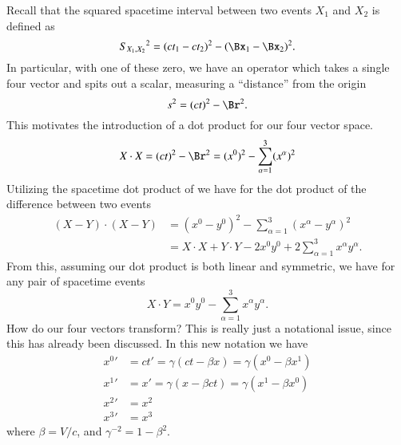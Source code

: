 Recall that the squared spacetime interval between two events \(X_1\) and \(X_2\) is defined as
%
\begin{equation}\label{eqn:relativisticElectrodynamicsT1:60}
{S_{X_1, X_2}}^2 = (ct_1 - c t_2)^2 - (\Bx_1 - \Bx_2)^2.
\end{equation}
%
In particular, with one of these zero, we have an operator which takes a single four vector and spits out a scalar, measuring a ``distance'' from the origin
%
\begin{equation}\label{eqn:relativisticElectrodynamicsT1:30}
s^2 = (ct)^2 - \Br^2.
\end{equation}
%
This motivates the introduction of a dot product for our four vector space.
%
\begin{equation}\label{eqn:relativisticElectrodynamicsT1:50}
X \cdot X = (ct)^2 - \Br^2 = (x^0)^2 - \sum_{\alpha=1}^3 (x^\alpha)^2
\end{equation}
%
Utilizing the spacetime dot product of  we have for the dot product of the difference between two events
%
\begin{equation}\label{eqn:relativisticElectrodynamicsT1a:140}
\begin{aligned}
(X - Y) \cdot (X - Y)
&=
(x^0 - y^0)^2 - \sum_{\alpha =1}^3 (x^\alpha - y^\alpha)^2 \\
&=
X \cdot X + Y \cdot Y - 2 x^0 y^0 + 2 \sum_{\alpha =1}^3 x^\alpha y^\alpha.
\end{aligned}
\end{equation}
%
From this, assuming our dot product  is both linear and symmetric, we have for any pair of spacetime events
%
\begin{equation}\label{eqn:relativisticElectrodynamicsT1:55}
X \cdot Y = x^0 y^0 - \sum_{\alpha =1}^3 x^\alpha y^\alpha.
\end{equation}
%
How do our four vectors transform?  This is really just a notational issue, since this has already been discussed.  In this new notation we have
%
\begin{equation}\label{eqn:relativisticElectrodynamicsT1:90}
\begin{aligned}
{x^0}' &= ct' = \gamma ( ct - \beta x) = \gamma ( x^0 - \beta x^1 ) \\
{x^1}' &= x' = \gamma ( x - \beta ct ) = \gamma ( x^1 - \beta x^0 ) \\
{x^2}' &= x^2 \\
{x^3}' &= x^3
\end{aligned}
\end{equation}
%
where \(\beta = V/c\), and \(\gamma^{-2} = 1 - \beta^2\).

